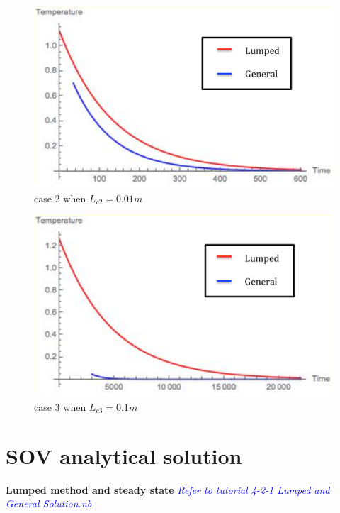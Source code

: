 \begin{solution}
\begin{figure}[H]
  \centering
    \includegraphics[scale=0.5]{figures/ch4/3}
    \caption{case 2 when $L_{c2}=0.01 m$}
    \label{fig:4:3}
\end{figure}

\begin{figure}[H]
  \centering
    \includegraphics[scale=0.5]{figures/ch4/4}
    \caption{case 3 when $L_{c3}=0.1 m$}
    \label{fig:4:4}
\end{figure}
\end{solution}

\section{SOV analytical solution}
\begin{example}
\textbf{Lumped method and steady state}
\textcolor{blue} {\emph{Refer to tutorial 4-2-1 Lumped and General Solution.nb}}
\end{example}

